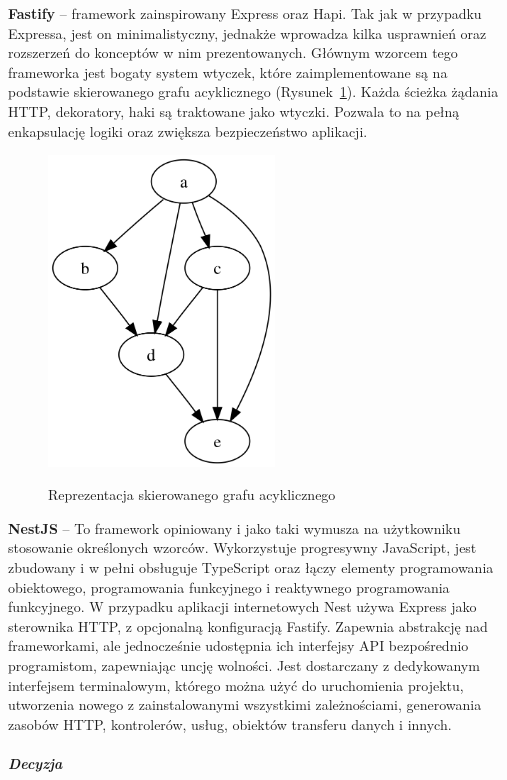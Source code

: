\documentclass[12pt, a4paper, twoside, openany]{book}
\begin{document}
\textbf{Fastify} -- framework zainspirowany Express oraz Hapi. Tak jak w przypadku Expressa,
jest on minimalistyczny, jednakże wprowadza kilka usprawnień oraz rozszerzeń do
konceptów w nim prezentowanych. Głównym wzorcem tego frameworka jest bogaty system
wtyczek, które zaimplementowane są na podstawie skierowanego grafu acyklicznego (Rysunek~\ref{fig:ADG}).
Każda ścieżka żądania HTTP, dekoratory, haki są traktowane jako wtyczki.
Pozwala to na pełną enkapsulację logiki oraz zwiększa bezpieczeństwo aplikacji.

\begin{figure}[h]
    \caption{Reprezentacja skierowanego grafu acyklicznego}
    \includegraphics[width=6cm]{../ADG.png}
    \centering
    \label{fig:ADG}
\end{figure}

\textbf{NestJS} -- To framework opiniowany i jako taki wymusza na użytkowniku stosowanie określonych wzorców.
Wykorzystuje progresywny JavaScript, jest zbudowany i w pełni obsługuje TypeScript oraz łączy elementy
programowania obiektowego, programowania funkcyjnego i reaktywnego programowania funkcyjnego.
W przypadku aplikacji internetowych Nest używa Express jako sterownika HTTP,
z opcjonalną konfiguracją Fastify. Zapewnia abstrakcję nad frameworkami,
ale jednocześnie udostępnia ich interfejsy API bezpośrednio programistom, zapewniając uncję wolności.
Jest dostarczany z dedykowanym interfejsem terminalowym, którego można użyć do uruchomienia projektu,
utworzenia nowego z zainstalowanymi wszystkimi zależnościami, generowania zasobów HTTP,
kontrolerów, usług, obiektów transferu danych i innych.

\subparagraph{Decyzja\\}
\end{document}
